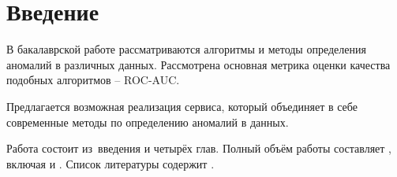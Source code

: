 \chapter*{Введение}                         %

В бакалаврской работе рассматриваются алгоритмы и методы определения аномалий в различных данных. Рассмотрена основная метрика оценки качества подобных алгоритмов -- ROC-AUC. 

Предлагается возможная реализация сервиса, который объединяет в себе современные методы по определению аномалий в данных.

Работа состоит из~введения и четырёх глав.
Полный объём работы составляет
, включая
 и
.   Список литературы содержит
.
